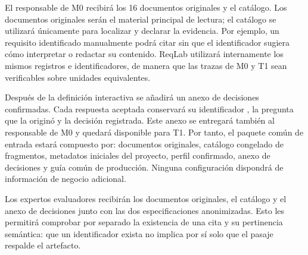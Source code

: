 El responsable de M0 recibirá los 16 documentos originales y el catálogo. Los documentos originales serán el material principal de lectura; el catálogo se utilizará únicamente para localizar y declarar la evidencia. Por ejemplo, un requisito identificado manualmente podrá citar  sin que el identificador sugiera cómo interpretar o redactar su contenido. ReqLab utilizará internamente los mismos registros e identificadores, de manera que las trazas de M0 y T1 sean verificables sobre unidades equivalentes.

Después de la definición interactiva se añadirá un anexo de decisiones confirmadas. Cada respuesta aceptada conservará su identificador , la pregunta que la originó y la decisión registrada. Este anexo se entregará también al responsable de M0 y quedará disponible para T1. Por tanto, el paquete común de entrada estará compuesto por: documentos originales, catálogo congelado de fragmentos, metadatos iniciales del proyecto, perfil confirmado, anexo de decisiones  y guía común de producción. Ninguna configuración dispondrá de información de negocio adicional.

Los expertos evaluadores recibirán los documentos originales, el catálogo y el anexo de decisiones junto con las dos especificaciones anonimizadas. Esto les permitirá comprobar por separado la existencia de una cita y su pertinencia semántica: que un identificador exista no implica por sí solo que el pasaje respalde el artefacto.

